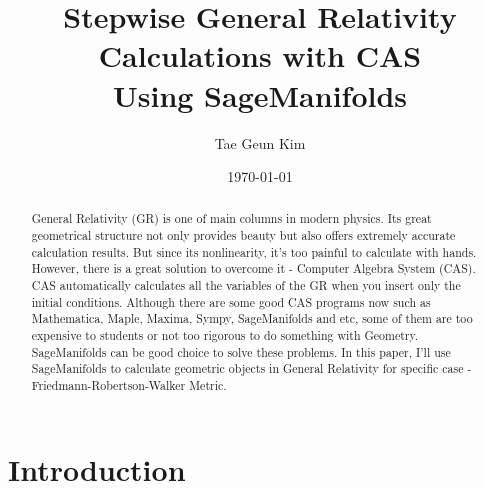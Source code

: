 \documentclass[%
 reprint,
 amsmath,amssymb,
 aps,
]{revtex4-1}
\begin{document}
\title{Stepwise General Relativity Calculations with CAS \\
  {\NM Using SageManifolds}
}

\author{Tae Geun Kim}

\date{\today}

\begin{abstract}
  General Relativity (GR) is one of main columns in modern physics.
  Its great geometrical structure not only provides beauty but also
  offers extremely accurate calculation results.
  But since its nonlinearity, it's too painful to calculate with hands. 
  However, there is a great solution to overcome it - Computer Algebra System (CAS).
  CAS automatically calculates all the variables of the GR when you insert only the initial
  conditions. Although there are some good CAS programs now such as Mathematica, Maple, Maxima,
  Sympy, SageManifolds and etc, some of them are too expensive to students
  or not too rigorous to do something with Geometry. SageManifolds can be good choice
  to solve these problems. In this paper, I'll use SageManifolds to calculate
  geometric objects in General Relativity for specific case -
  Friedmann-Robertson-Walker Metric. 
\end{abstract}

\maketitle

\section{\label{sec:intro}Introduction}
\end{document}
